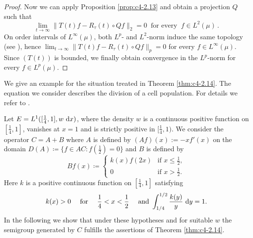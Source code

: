 \begin{proof}
Now we can apply Proposition \ref{prop:c4-2.13} and obtain a projection $Q$ such that 
\[ 
\lim_{t \to \infty}\|T(t)f - R_{\tau}(t) \circ Qf\|_{2} = 0 \ \text{ for every 
} \ f \in L^{2}(\mu)\,.
\]
On order intervals of $L^{\infty}(\mu)$, both $L^{p}$- and $L^{2}$-norm induce the same topology (see \citet[V.8.3]{schaefer:1974}), 
hence $\lim_{t \to \infty} \|T(t)f - R_{\tau}(t) \circ Qf\|_{p} = 0$ for every $f \in L^{\infty}(\mu)$.
Since $(T(t))$ is bounded, we finally obtain convergence in the $L^{p}$-norm for every $f \in L^{p}(\mu)$.
\end{proof}
We give an example for the situation treated in Theorem \ref{thm:c4-2.14}.
The equation we consider describes the division of a cell population.
For details we refer to \citet{diekmannetal:1984}.

\begin{example}\label{ex:c4-2.15}
%
%
%
Let $E = L^{1}([\frac{1}{4},1],w\,\mathop{}\!\mathrm{d}{x})$, where the density $w$ is a continuous positive function on $[\frac{1}{4},1]$, vanishes at $x = 1$ and is strictly positive in $[\frac{1}{4},1)$.
We consider the operator $C = A + B$ where $A$ is defined by $(Af)(x) := -xf'(x)$ on the domain $D(A) \coloneqq \{f \in AC \colon f(\frac{1}{2}) = 0\}$ and $B$ is defined by
\begin{equation*}\label{eq:c4-2.12-kgk}
Bf(x) \coloneqq \begin{cases}
    k(x)f(2x) & \text{if } x \leq \frac{1}{2}, \\
    0 & \text{if } x > \frac{1}{2}.
\end{cases}
\end{equation*}
Here $k$ is a positive continuous function on $[\frac{1}{4},1]$ satisfying
\begin{equation}\label{eq:c4-2.13}
k(x) > 0 \quad \text{ for } \quad \frac{1}{4} < x < \frac{1}{2} \quad \text{ and }  \int_{1/4}^{1/2} \frac{k(y)}{y} \, \mathop{}\!\mathrm{d}{y} = 1.
\end{equation}
In the following we show that under these hypotheses and for suitable $w$ the semigroup generated by $C$ fulfills the assertions of Theorem \ref{thm:c4-2.14}.


\end{example}
